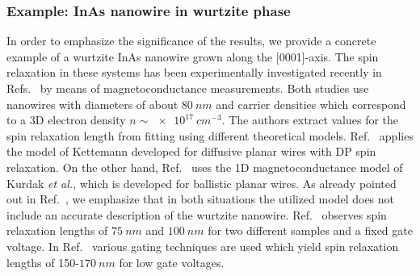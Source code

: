 \documentclass[superscriptaddress,noshowpacs,noshowkeys, twocolumn, floatfix,aps, prb,reprint]{revtex4-1}
\begin{document}
\subsubsection*{Example: InAs nanowire in wurtzite phase}

In order to emphasize the significance of the results, we provide a concrete example of a wurtzite InAs nanowire grown along the [0001]-axis.
The spin relaxation in these systems has been experimentally investigated recently in Refs.~ by means of magnetoconductance measurements.
Both studies use nanowires with diameters of about $\SI{80}{nm}$ and carrier densities which correspond to a 3D electron density $n\sim \SI{e17}{cm^{-3}}$.
The authors extract values for the spin relaxation length from fitting using different theoretical models.
Ref.~ applies the model of Kettemann\cite{Kettemann2007a} developed for diffusive planar wires with DP spin  relaxation.
On the other hand, Ref.~ uses the 1D magnetoconductance model of Kurdak \textit{et al.},\cite{Kurdak1992} which is developed for ballistic planar wires.
As already pointed out in Ref.~, we emphasize that in both situations the utilized model does not include an accurate description of the wurtzite nanowire.
Ref.~ observes spin relaxation lengths of $\SI{75}{nm}$  and $\SI{100}{nm}$ for two different samples and a fixed gate voltage. 
In Ref.~ various gating techniques are used which yield spin relaxation lengths of 150-$\SI{170}{nm}$ for low gate voltages.
\end{document}
